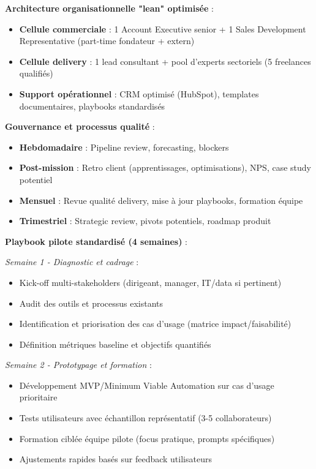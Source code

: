 \textbf{Architecture organisationnelle "lean" optimisée} :
\begin{itemize}
    \item \textbf{Cellule commerciale} : 1 Account Executive senior + 1 Sales Development Representative (part-time fondateur + extern)
    \item \textbf{Cellule delivery} : 1 lead consultant + pool d'experts sectoriels (5 freelances qualifiés)
    \item \textbf{Support opérationnel} : CRM optimisé (HubSpot), templates documentaires, playbooks standardisés
\end{itemize}

\textbf{Gouvernance et processus qualité} :
\begin{itemize}
    \item \textbf{Hebdomadaire} : Pipeline review, forecasting, blockers
    \item \textbf{Post-mission} : Retro client (apprentissages, optimisations), NPS, case study potentiel
    \item \textbf{Mensuel} : Revue qualité delivery, mise à jour playbooks, formation équipe
    \item \textbf{Trimestriel} : Strategic review, pivots potentiels, roadmap produit
\end{itemize}

\textbf{Playbook pilote standardisé (4 semaines)} :

\textit{Semaine 1 - Diagnostic et cadrage} :
\begin{itemize}
    \item Kick-off multi-stakeholders (dirigeant, manager, IT/data si pertinent)
    \item Audit des outils et processus existants
    \item Identification et priorisation des cas d'usage (matrice impact/faisabilité)
    \item Définition métriques baseline et objectifs quantifiés
\end{itemize}

\textit{Semaine 2 - Prototypage et formation} :
\begin{itemize}
    \item Développement MVP/Minimum Viable Automation sur cas d'usage prioritaire
    \item Tests utilisateurs avec échantillon représentatif (3-5 collaborateurs)
    \item Formation ciblée équipe pilote (focus pratique, prompts spécifiques)
    \item Ajustements rapides basés sur feedback utilisateurs
\end{itemize}

